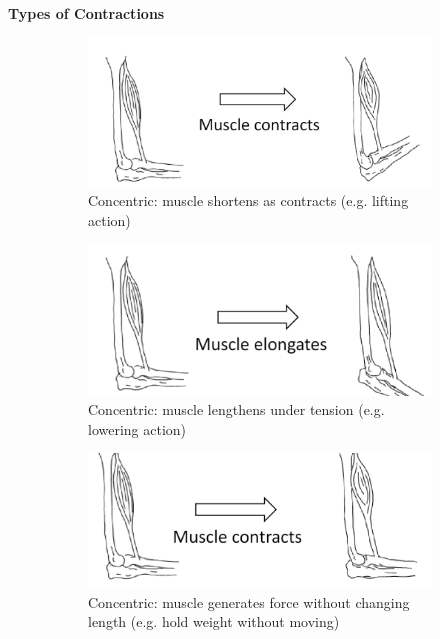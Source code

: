 \documentclass[11pt,fleqn]{book}
\begin{document}
\textbf{Types of Contractions}
\begin{figure}[h!]
    \centering
    \begin{subfigure}{0.45\textwidth}
        \includegraphics[width=\textwidth]{Pictures/Screenshot 2024-04-03 000405.png}
        \caption{Concentric: muscle shortens
as contracts (e.g. lifting
action)}
    \end{subfigure}
    \hfill
    \begin{subfigure}{0.45\textwidth}
        \includegraphics[width=\textwidth]{Pictures/Screenshot 2024-04-03 000414.png}
        \caption{Concentric: muscle lengthens
under tension (e.g. lowering
action)}
    \end{subfigure}
    \begin{subfigure}{0.45\textwidth}
        \includegraphics[width=\textwidth]{Pictures/Screenshot 2024-04-03 000424.png}
        \caption{Concentric: muscle generates
force without changing length
(e.g. hold weight without
moving)}
    \end{subfigure}
    \caption{}
\end{figure}
\end{document}
